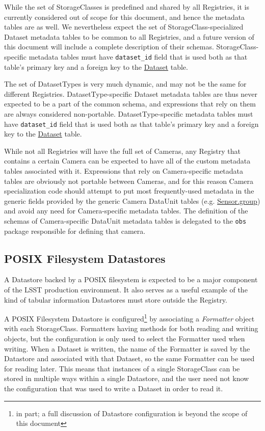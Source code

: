 \documentclass[DM,toc]{lsstdoc}
\newcommand{\tblref}[1]{\hyperref[tbl:#1]{#1}}
\begin{document}
While the set of StorageClasses is predefined and shared by all Registries, it is currently considered out of scope for this document, and hence the metadata tables are as well.
We nevertheless expect the set of StorageClass-specialized Dataset metadata tables to be common to all Registries, and a future version of this document will include a complete description of their schemas.
StorageClass-specific metadata tables must have \texttt{dataset\_id} field that is used both as that table's primary key and a foreign key to the \tblref{Dataset} table.

The set of DatasetTypes is very much dynamic, and may not be the same for different Registries.
DatasetType-specific Dataset metadata tables are thus never expected to be a part of the common schema, and expressions that rely on them are always considered non-portable.
DatasetType-specific metadata tables must have \texttt{dataset\_id} field that is used both as that table's primary key and a foreign key to the \tblref{Dataset} table.

While not all Registries will have the full set of Cameras, any Registry that contains a certain Camera can be expected to have all of the custom metadata tables associated with it.
Expressions that rely on Camera-specific metadata tables are obviously not portable between Cameras, and for this reason Camera specialization code should attempt to put most frequently-used metadata in the generic fields provided by the generic Camera DataUnit tables (e.g. \hyperref[tbl:Sensor]{Sensor.group}) and avoid any need for Camera-specific metadata tables.
The definition of the schemas of Camera-specific DataUnit metadata tables is delegated to the \texttt{obs} package responsible for defining that camera.

\subsection{POSIX Filesystem Datastores}

A Datastore backed by a POSIX filesystem is expected to be a major component of the LSST production environment.
It also serves as a useful example of the kind of tabular information Datastores must store outside the Registry.

A POSIX Filesystem Datastore is configured\footnote{in part; a full discussion of Datastore configuration is beyond the scope of this document} by associating a \emph{Formatter} object with each StorageClass.
Formatters having methods for both reading and writing objects, but the configuration is only used to select the Formatter used when writing.
When a Dataset is written, the name of the Formatter is saved by the Datastore and associated with that Dataset, so the same Formatter can be used for reading later.
This means that instances of a single StorageClass can be stored in multiple ways within a single Datastore, and the user need not know the configuration that was used to write a Dataset in order to read it.
\end{document}
